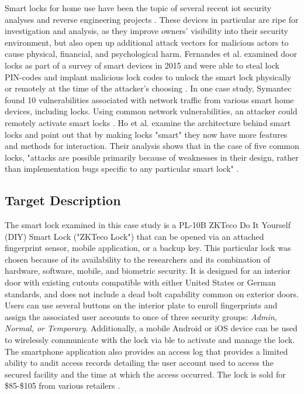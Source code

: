 \documentclass[conference]{IEEEtran}
\begin{document}
\bigskip

Smart locks for home use have been the topic of several recent \gls{iot} security analyses and reverse engineering projects \cite{Ho2016}\cite{Fuller2017}\cite{Ye2017}\cite{Jeong2016}. These devices in particular are ripe for investigation and analysis, as they improve owners' visibility into their security environment, but also open up additional attack vectors for malicious actors to cause physical, financial, and psychological harm. Fernandes et al. examined door locks as part of a survey of smart devices in 2015 and were able to steal lock PIN-codes and implant malicious lock codes to unlock the smart lock physically or remotely at the time of the attacker's choosing \cite{Fernandes2016}. In one case study, Symantec found 10 vulnerabilities associated with network traffic from various smart home devices, including locks. Using common network vulnerabilities, an attacker could remotely activate smart locks \cite{Barcena2015}. Ho et al. examine the architecture behind smart locks and point out that by making locks "smart" they now have more features and methods for interaction. Their analysis shows that in the case of five common locks, "attacks are possible primarily because of weaknesses in their design, rather than implementation bugs specific to any particular smart lock" \cite{Ho2016}.

\subsection{Target Description}

The smart lock examined in this case study is a PL-10B ZKTeco Do It Yourself (DIY) Smart Lock ("ZKTeco Lock") that can be opened via an attached fingerprint sensor, mobile application, or a backup key. This particular lock was chosen because of its availability to the researchers and its combination of hardware, software, mobile, and biometric security. It is designed for an interior door with existing cutouts compatible with either United States or German standards, and does not include a dead bolt capability common on exterior doors. Users can use several buttons on the interior plate to enroll fingerprints and assign the associated user accounts to once of three security groups: \textit{Admin, Normal, or Temporary}.  Additionally, a mobile Android or iOS device can be used to wirelessly communicate with the lock via \gls{ble} to activate and manage the lock. The smartphone application also provides an access log that provides a limited ability to audit access records detailing the user account used to access the secured facility and the time at which the access occurred. The lock is sold for \$85-\$105 from various retailers \cite{ZKTeco}. 
\end{document}
